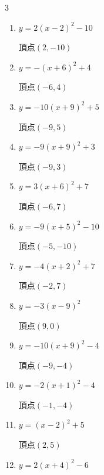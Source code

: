 \begin{multicols}{3}
\begin{enumerate}
        $\displaystyle 頂点\left( -8 , 6 \right)$

  \item $\displaystyle y=2\left( x-2\right)^{2}-10$

        $\displaystyle 頂点\left( 2 , -10 \right)$

  \item $\displaystyle y=-\left( x+6\right)^{2}+4$

        $\displaystyle 頂点\left( -6 , 4 \right)$

  \item $\displaystyle y=-10\left( x+9\right)^{2}+5$

        $\displaystyle 頂点\left( -9 , 5 \right)$

  \item $\displaystyle y=-9\left( x+9\right)^{2}+3$

        $\displaystyle 頂点\left( -9 , 3 \right)$

  \item $\displaystyle y=3\left( x+6\right)^{2}+7$

        $\displaystyle 頂点\left( -6 , 7 \right)$

  \item $\displaystyle y=-9\left( x+5\right)^{2}-10$

        $\displaystyle 頂点\left( -5 , -10 \right)$

  \item $\displaystyle y=-4\left( x+2\right)^{2}+7$

        $\displaystyle 頂点\left( -2 , 7 \right)$

  \item $\displaystyle y=-3\left( x-9\right)^{2}$

        $\displaystyle 頂点\left( 9 , 0 \right)$

  \item $\displaystyle y=-10\left( x+9\right)^{2}-4$

        $\displaystyle 頂点\left( -9 , -4 \right)$

  \item $\displaystyle y=-2\left( x+1\right)^{2}-4$

        $\displaystyle 頂点\left( -1 , -4 \right)$

  \item $\displaystyle y=\left( x-2\right)^{2}+5$

        $\displaystyle 頂点\left( 2 , 5 \right)$

  \item $\displaystyle y=2\left( x+4\right)^{2}-6$


\end{enumerate}
\end{multicols}
